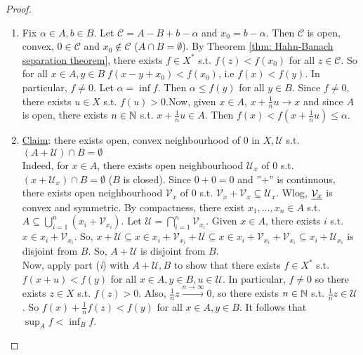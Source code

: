 \documentclass{article}
\begin{document}
\begin{proof}
    \begin{enumerate}[label = (\roman*), align = left]
        \item Fix $\alpha\in A, b \in B$. Let $\mathcal{C} = A-B+b-\alpha$ and $x_0 = b-\alpha$. Then $\mathcal{C}$ is open, convex, $0\in \mathcal{C}$ and $x_0\not\in \mathcal{C}$ ($A\cap B=\emptyset$). By Theorem \ref{thm: Hahn-Banach separation theorem}, there exists $f\in X^*$ s.t. $f(z)<f(x_0)$ for all $z\in \mathcal{C}$. So for all $x\in A, y\in B\; f(x-y+x_0)<f(x_0)$, i.e $f(x)<f(y)$. In particular, $f\neq 0$. Let $\alpha = \inf f$. Then $\alpha\leq f(y)$ for all $y\in B$. Since $f\neq 0$, there exists $u\in X$ s.t. $f(u)>0$.Now, given $x\in A$, $x+\frac{1}{n}u\to x$ and since $A$ is open, there exists $n\in \mathbb{N}$ s.t. $x+\frac{1}{n}u\in A$. Then $f(x)<f(x+\frac{1}{n}u)\leq \alpha$.
        \item \noindent\underline{Claim}: there exists open, convex neighbourhood of $0$ in $X, \mathcal{U}$ s.t. $(A+\mathcal{U})\cap B=\emptyset$\\

        Indeed, for $x\in A$, there exists open neighbourhood $\mathcal{U}_x$ of $0$ s.t. $(x+\mathcal{U}_x)\cap B=\emptyset$ ($B$ is closed). Since $0+0=0$ and ''$+$'' is continuous, there exists open neighbourhood $\mathcal{V}_x$ of $0$ s.t. $\mathcal{V}_x+\mathcal{V}_x\subseteq \mathcal{U}_x$. Wlog, $\noindent\underline{\mathcal{V}_x}$ is convex and symmetric. By compactness, there exist $x_1, \dots, x_n\in A$ s.t. $A\subseteq \displaystyle\bigcup^n_{i=1}(x_i+\mathcal{V}_{x_i})$. Let $\mathcal{U }= \displaystyle\bigcap^n_{i=1}\mathcal{V}_{x_i}$. Given $x\in A$, there exists $i$ s.t. $x\in x_i + \mathcal{V}_{x_i}$. So, $x+\mathcal{U}\subseteq x\in x_i + \mathcal{V}_{x_i}+\mathcal{U}\subseteq x\in x_i + \mathcal{V}_{x_i} + \mathcal{V}_{x_i}\subseteq x_i + \mathcal{U}_{x_i}$ is disjoint from $B$. So, $A+\mathcal{U}$ is disjoint from $B$.\\

        Now, apply part (\textit{i}) with $A+\mathcal{U}, B$ to show that there exists $f\in X^*$ s.t. $f(x+u)<f(y)$ for all $x\in A, y\in B, u\in \mathcal{U}$. In particular, $f\neq 0$ so there exists $z\in X$ s.t. $f(z)>0$. Also, $\frac{1}{n}z\xrightarrow{n\to\infty}0$, so there exists $n\in \mathbb{N}$ s.t. $\frac{1}{n}z\in \mathcal{U}$. So $f(x)+\frac{1}{n}f(z)<f(y)$ for all $x\in A, y\in B$. It follows that $\displaystyle\sup_A f< \displaystyle\inf_B f$.
    \end{enumerate}
\end{proof}
\end{document}
